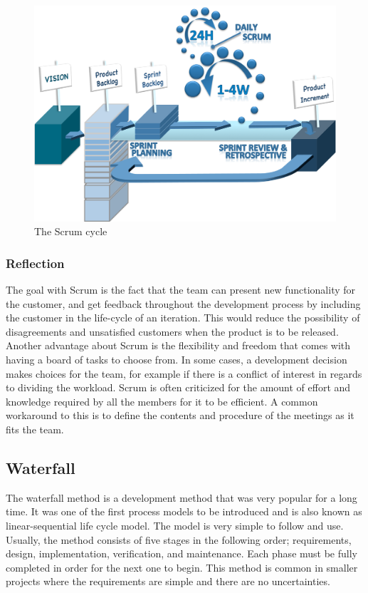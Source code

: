 \begin{figure}[H]
\centering
    \includegraphics[width=\textwidth]{images/scrum.png}
    \caption{The Scrum cycle}
    \label{fig:Scrum}
\end{figure}

\subsubsection{Reflection}
The goal with Scrum is the fact that the team can present new functionality for the customer, and get feedback throughout the development process by including the customer in the life-cycle of an iteration. This would reduce the possibility of disagreements and unsatisfied customers when the product is to be released. Another advantage about Scrum is the flexibility and freedom that comes with having a board of tasks to choose from. In some cases, a development decision makes choices for the team, for example if there is a conflict of interest in regards to dividing the workload. Scrum is often criticized for the amount of effort and knowledge required by all the members for it to be efficient. A common workaround to this is to define the contents and procedure of the meetings as it fits the team.  

\subsection{Waterfall}
The waterfall method is a development method that was very popular for a long time. It was one of the first process models to be introduced and is also known as linear-sequential life cycle model. The model is very simple to follow and use. Usually, the method consists of five stages in the following order; requirements, design, implementation, verification, and maintenance. Each phase must be fully completed in order for the next one to begin. This method is common in smaller projects where the requirements are simple and there are no uncertainties.\cite{wf}


